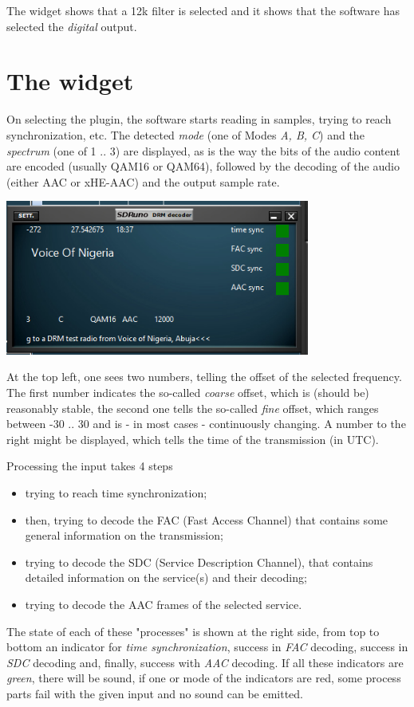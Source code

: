 \documentclass[10pt]{article}
\begin{document}
The widget shows that a 12k filter is selected and it shows that the
software has selected the {\em digital} output.

\section{The widget}
On selecting the plugin, the software starts reading in samples,
trying to reach synchronization, etc.
The detected {\em mode} (one of Modes {\em A, B, C})  and the {\em spectrum}
(one of 1 .. 3) are displayed, as is the way the bits of the
audio content are encoded (usually QAM16 or QAM64), followed by
the decoding of the audio (either AAC or xHE-AAC) and the output
sample rate.
\par

\includegraphics[width=100mm]{drm-decoder-widget.png}

At the top left, one sees two numbers, telling the offset of the selected
frequency. The first number indicates the so-called {\em coarse} offset,
which is (should be) reasonably stable, the second one tells the
so-called {\em fine} offset, which ranges between -30 .. 30 and is
- in most cases - continuously changing. A number to the right
might be displayed, which tells the time of the transmission (in UTC).
\par
Processing the input takes 4 steps
\begin{itemize}
\item trying to reach time synchronization;
\item then, trying to decode the FAC (Fast Access Channel) that contains
some general information on the transmission;
\item trying to decode the SDC (Service Description Channel), that contains
detailed information on the service(s) and their decoding;
\item trying to decode the AAC frames of the selected service.
\end{itemize}
The state of each of these "processes" is shown at the right side,
from top to bottom an indicator for {\em time synchronization}, success
in {\em FAC} decoding, success in {\em SDC} decoding and, finally, success
with {\em AAC} decoding. 
If all these indicators are {\em green}, there will be sound, if one or
mode of the indicators are red, some process parts fail with the given input
and no sound can be emitted.
\end{document}

